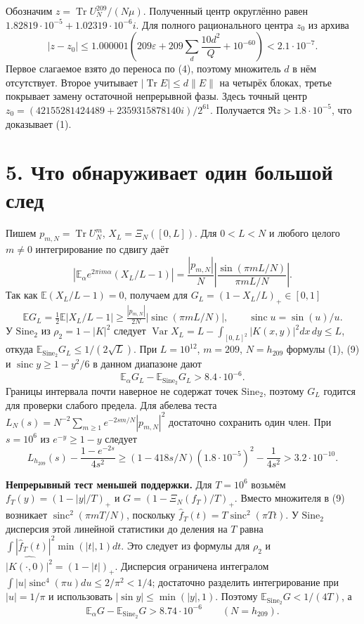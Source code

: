\documentclass[11pt,a4paper]{article}
\newcommand{\Tr}{\operatorname{Tr}}
\newcommand{\EE}{\mathbb E}
\newcommand{\si}{\mathrm{Sine}_2}
\newcommand{\eps}{\varepsilon}
\newcommand{\sinc}{\operatorname{sinc}}
\newcommand{\sect}[1]{\section*{\sffamily\color{ink}#1}}
\newcommand{\subt}[1]{\par\medskip\noindent\textbf{#1.}\quad}
\begin{document}
Обозначим $z=\Tr U_N^{209}/(N\mu)$. Полученный центр округлённо равен $1.82819\cdot10^{-5}+1.02319\cdot10^{-6}i$. Для полного рационального центра $z_0$ из архива
\[
 |z-z_0|\le1.000001\left(209\eps+209\sum_{d}\frac{10d^2}{Q}+10^{-60}\right)
 <2.1\cdot10^{-7}.                                                        \tag{8}
\]
Первое слагаемое взято до переноса по (4), поэтому множитель $d$ в нём отсутствует. Второе учитывает $|\Tr E|\le d\|E\|$ на четырёх блоках, третье покрывает замену остаточной непрерывной фазы. Здесь точный центр $z_0=(42155281424489+2359315878140i)/2^{61}$. Получается $\Re z>1.8\cdot10^{-5}$, что доказывает (1).
\newpage
\sect{5. Что обнаруживает один большой след}
Пишем $p_{m,N}=\Tr U_N^m$, $X_L=\Xi_N([0,L])$. Для $0<L<N$ и любого целого $m\ne0$ интегрирование по сдвигу даёт
\[
 \left|\EE_\alpha e^{2\pi i m\alpha}(X_L/L-1)\right|
 =\frac{|p_{m,N}|}{N}\left|\frac{\sin(\pi m L/N)}{\pi m L/N}\right|.
\]
Так как $\EE(X_L/L-1)=0$, получаем для $G_L=(1-X_L/L)_+\in[0,1]$
\[
 \EE G_L=\tfrac12\EE|X_L/L-1|\ge\tfrac{|p_{m,N}|}{2N}
 |\sinc(\pi m L/N)|,\qquad \sinc u=\sin(u)/u .                          \tag{9}
\]
У $\si$ из $\rho_2=1-|K|^2$ следует $\operatorname{Var}X_L
=L-\int_{[0,L]^2}|K(x,y)|^2dx\,dy\le L$, откуда $\EE_{\si}G_L\le1/(2\sqrt L)$. При $L=10^{12}$, $m=209$, $N=h_{209}$ формулы (1), (9) и $\sinc y\ge1-y^2/6$ в данном диапазоне дают
\[
 \EE_\alpha G_L-\EE_{\si}G_L>8.4\cdot10^{-6}.                          \tag{10}
\]
Границы интервала почти наверное не содержат точек $\si$, поэтому $G_L$ годится для проверки слабого предела. Для абелева теста $L_N(s)=N^{-2}\sum_{m\ge1}e^{-2sm/N}|p_{m,N}|^2$ достаточно сохранить один член. При $s=10^6$ из $e^{-y}\ge1-y$ следует
\[
 L_{h_{209}}(s)-\frac{1-e^{-2s}}{4s^2}
 \ge (1-418s/N)(1.8\cdot10^{-5})^2-\frac1{4s^2}>3.2\cdot10^{-10}.
\]

\subt{Непрерывный тест меньшей поддержки} Для $T=10^6$ возьмём $f_T(y)=(1-|y|/T)_+$ и $G=(1-\Xi_N(f_T)/T)_+$. Вместо множителя в (9) возникает $\sinc^2(\pi mT/N)$, поскольку $\widehat f_T(t)=T\sinc^2(\pi Tt)$. У $\si$ дисперсия этой линейной статистики до деления на $T$ равна $\int |\widehat f_T(t)|^2\min(|t|,1)dt$. Это следует из формулы для $\rho_2$ и $\widehat{|K(\cdot,0)|^2}=(1-|t|)_+$. Дисперсия ограничена интегралом $\int |u|\sinc^4(\pi u)du\le 2/\pi^2<1/4$; достаточно разделить интегрирование при $|u|=1/\pi$ и использовать $|\sin y|\le\min(|y|,1)$. Поэтому $\EE_{\si}G<1/(4T)$, а
\[
 \EE_\alpha G-\EE_{\si}G>8.74\cdot10^{-6}\qquad(N=h_{209}).
\]
\end{document}
